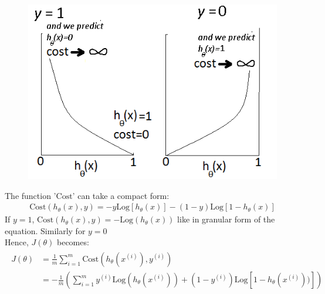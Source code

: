 \documentclass[a4paper,12pt]{report}
\begin{document}
\begin{figure}[H]
\centering
        \includegraphics[totalheight=6 cm]{cost.png}
\end{figure}
The function '$\mathrm{Cost}$' can take a compact form:
\begin{align*}
\mathrm{Cost}(h_{\theta}(x), y) = -y \mathrm{Log}\left[h_{\theta}(x)\right] - (1-y)\mathrm{Log}\left[1-h_{\theta}(x)\right]
\end{align*}
If $y=1$, $\mathrm{Cost}(h_{\theta}(x),y) = -\mathrm{Log}(h_{\theta}(x))$ like in granular form of the equation. Similarly for $y=0$\\
Hence, $J(\theta)$ becomes:
\begin{align*}
\begin{split}
J(\theta) & = \frac{1}{m} \sum_{i=1} ^m \mathrm{Cost}(h_{\theta}(x^{(i)}), y^{(i)}) \\
& = -\frac{1}{m} \left(\sum_{i=1} ^m y^{(i)}\mathrm{Log}(h_{\theta}(x^{(i)})) + (1-y^{(i)})\mathrm{Log}\left[1-h_{\theta}(x^{(i)})) \right] \right)
\end{split}
\end{align*}
\end{document}

